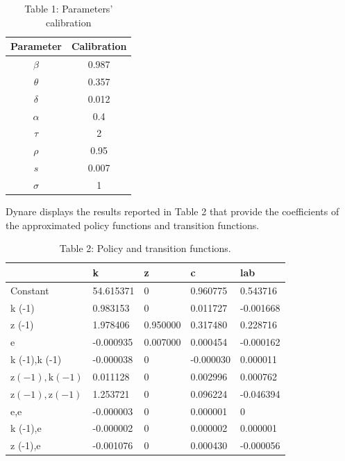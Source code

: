 \documentclass[10pt]{article}
\begin{document}
\begin{table}[h]
\begin{center}
\begin{tabular}{cc}
\hline\hline
Parameter & Calibration \\
\hline
$\beta$ & 0.987 \\
$\theta$ & 0.357 \\
$\delta$ & 0.012 \\
$\alpha$ & 0.4 \\
$\tau$ & 2 \\
$\rho$ & 0.95 \\
$s$ & 0.007 \\
$\sigma$ & 1 \\
\hline\hline
\end{tabular}
\captionsetup{labelformat=empty}
\caption{Table 1: Parameters' calibration}
\end{center}
\end{table}

Dynare displays the results reported in Table 2 that provide the coefficients of the approximated policy functions and transition functions.

\begin{table}[h]
\begin{center}
\begin{tabular}{|l|l|l|l|l|}
\hline
 & k & z & c & lab \\
\hline
Constant & 54.615371 & 0 & 0.960775 & 0.543716 \\
\hline
k (-1) & 0.983153 & 0 & 0.011727 & -0.001668 \\
\hline
z (-1) & 1.978406 & 0.950000 & 0.317480 & 0.228716 \\
\hline
e & -0.000935 & 0.007000 & 0.000454 & -0.000162 \\
\hline
k (-1),k (-1) & -0.000038 & 0 & -0.000030 & 0.000011 \\
\hline
$\mathrm{z}(-1), \mathrm{k}(-1)$ & 0.011128 & 0 & 0.002996 & 0.000762 \\
\hline
$\mathrm{z}(-1), \mathrm{z}(-1)$ & 1.253721 & 0 & 0.096224 & -0.046394 \\
\hline
e,e & -0.000003 & 0 & 0.000001 & 0 \\
\hline
k (-1),e & -0.000002 & 0 & 0.000002 & 0.000001 \\
\hline
z (-1),e & -0.001076 & 0 & 0.000430 & -0.000056 \\
\hline
\end{tabular}
\captionsetup{labelformat=empty}
\caption{Table 2: Policy and transition functions.}
\end{center}
\end{table}
\end{document}

